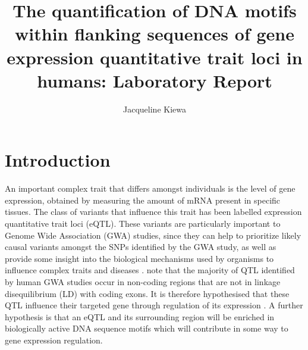 \documentclass[12pt]{article}
\begin{document}


\title{The quantification of DNA motifs within flanking sequences of gene expression quantitative trait loci in humans: Laboratory Report}


\author{Jacqueline Kiewa}





\doublespacing
\maketitle
\clearpage
\tableofcontents


\clearpage
\section{Introduction}

An important complex trait that differs amongst individuals is the level of gene expression, obtained by measuring the amount of mRNA present in specific tissues. The class of variants that influence this trait has been labelled expression quantitative trait loci (eQTL). These variants are particularly important to Genome Wide Association (GWA) studies, since they can help to prioritize likely causal variants amongst the SNPs identified by the GWA study, as well as provide some insight into the biological mechanisms used by organisms to influence complex traits and diseases \citep{albert2015role}. \citet{albert2015role} note that the majority of QTL identified by human GWA studies occur in non-coding regions that are not in linkage disequilibrium (LD) with coding exons. It is therefore hypothesised that these QTL influence their targeted gene through regulation of its expression \citep{nica2013expression}. A further hypothesis is that an eQTL and its surrounding region will be enriched in biologically active DNA sequence motifs which will contribute in some way to gene expression regulation. 
\end{document}
